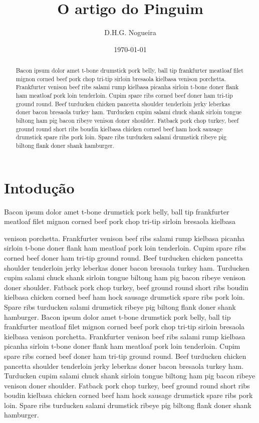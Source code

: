 \documentclass[a4paper,11pt,twocolumn]{article}
\title{O artigo do Pinguim}
\author{D.H.G. Nogueira}
\date{\today}
\begin{document}
\maketitle


\begin{abstract}
Bacon ipsum dolor amet t-bone drumstick pork belly, ball tip frankfurter meatloaf filet mignon corned beef pork chop tri-tip sirloin bresaola kielbasa venison porchetta. Frankfurter venison beef ribs salami rump kielbasa picanha sirloin t-bone doner flank ham meatloaf pork loin tenderloin. Cupim spare ribs corned beef doner ham tri-tip ground round. Beef turducken chicken pancetta shoulder tenderloin jerky leberkas doner bacon bresaola turkey ham. Turducken cupim salami chuck shank sirloin tongue biltong ham pig bacon ribeye venison doner shoulder. Fatback pork chop turkey, beef ground round short ribs boudin kielbasa chicken corned beef ham hock sausage drumstick spare ribs pork loin. Spare ribs turducken salami drumstick ribeye pig biltong flank doner shank hamburger.

\end{abstract}

\section{Intodução\label{intro}}
Bacon ipsum dolor amet t-bone drumstick pork belly, ball tip frankfurter meatloaf filet mignon corned beef pork chop tri-tip sirloin bresaola kielbasa

venison porchetta. Frankfurter venison beef ribs salami rump kielbasa picanha sirloin t-bone doner flank ham meatloaf pork loin tenderloin. Cupim spare ribs corned beef doner ham tri-tip ground round. Beef turducken chicken pancetta shoulder tenderloin jerky leberkas doner bacon bresaola turkey ham. Turducken cupim salami chuck shank sirloin tongue biltong ham pig bacon ribeye venison doner shoulder. Fatback pork chop turkey, beef ground round short ribs boudin kielbasa chicken corned beef ham hock sausage drumstick spare ribs pork loin. Spare ribs turducken salami drumstick ribeye pig biltong flank doner shank hamburger.
Bacon ipsum dolor amet t-bone drumstick pork belly, ball tip frankfurter meatloaf filet mignon corned beef pork chop tri-tip sirloin bresaola kielbasa venison porchetta. Frankfurter venison beef ribs salami rump kielbasa picanha sirloin t-bone doner flank ham meatloaf pork loin tenderloin. Cupim spare ribs corned beef doner ham tri-tip ground round. Beef turducken chicken pancetta shoulder tenderloin jerky leberkas doner bacon bresaola turkey ham. Turducken cupim salami chuck shank sirloin tongue biltong ham pig bacon ribeye venison doner shoulder. Fatback pork chop turkey, beef ground round short ribs boudin kielbasa chicken corned beef ham hock sausage drumstick spare ribs pork loin. Spare ribs turducken salami drumstick ribeye pig biltong flank doner shank hamburger.
\end{document}
